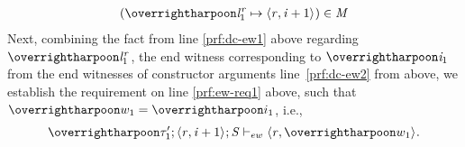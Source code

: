 \begin{nproof}
\begin{bcase}
\begin{itemize}
\begin{itemize}
\begin{itemize}
\begin{align*}
                      (\overharpoon{\locreg{\loc}{\reg}_1} \mapsto \concreteloc{\reg}{\ind + 1}{})  \in \MENV
           \end{align*}
           Next, combining the fact from line \ref{prf:dc-ew1} above regarding $\overharpoon{\locreg{\loc}{\reg}_1}$, the
           end witness corresponding to $\overharpoon{\ind_1}$ from the end witnesses of
           constructor arguments line~\ref{prf:dc-ew2} from above, we
           establish the requirement on line \ref{prf:ew-req1} above, such that $\overharpoon{w_1} = \overharpoon{i_1}$, i.e.,
           \begin{align}
           \ewitness{\overharpoon{\TYP'_1}}{\concreteloc{\reg}{\ind + 1}{}}{\STOR}{\concreteloc{\reg}{\overharpoon{w_1}}{}} \label{prf:dc-ew-f1}.
           \end{align}


\end{itemize}
\end{itemize}
\end{itemize}
\end{bcase}
\end{nproof}
